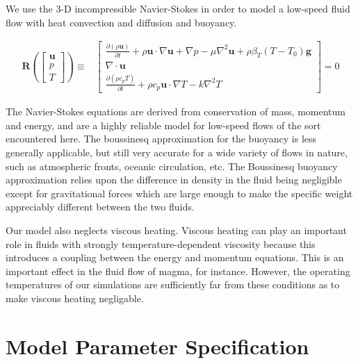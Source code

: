 \documentclass{article}
\newcommand{\bv}[1]{{\ensuremath{\boldsymbol{#1}}}}
\begin{document}
We use the 3-D incompressible Navier-Stokes in order to model a
low-speed fluid flow with heat convection and diffusion and buoyancy. 

\begin{align*}
    \bv{R}\left(\left[
    \begin{array}{l}
        \bv{u} \\
        p \\
        T 
    \end{array}
    \right]\right) \equiv& 
    \left[
    \begin{array}{l}
        \frac{\partial (\rho \bv{u})}{\partial t} + \rho \bv{u} \cdot
    \nabla \bv{u} + \nabla p - \mu \nabla^2 \bv{u} + 
    \rho \beta_T (T - T_0) \bv{g} \\
    \nabla \cdot \bv{u} \\
    \frac{\partial (\rho c_p T)}{\partial t} + \rho c_p \bv{u} \cdot
    \nabla T - k \nabla^2 T
    \end{array} 
    \right] = 0
\end{align*}

The Navier-Stokes equations are derived from conservation of mass,
momentum and energy, and are a highly reliable model for low-speed flows
of the sort encountered here. The boussinesq approximation for the
buoyancy is less generally applicable, but still very accurate for a
wide variety of flows in nature, such as atmospheric fronts, oceanic
circulation, etc. The Boussinesq buoyancy approximation relies upon the
difference in density in the fluid being negligible except for gravitational
forces which are large enough to make the specific weight appreciably different
between the two fluids.

Our model also neglects viscous heating. Viscous heating can play an
important role in fluids with strongly temperature-dependent viscosity
because this introduces a coupling between the energy and momentum
equations. This is an important effect in the fluid flow of magma, for
instance.  However, the operating temperatures of our simulations are
sufficiently far from these conditions as to make viscous heating
negligable. 



%
% 
%
%
\section{Model Parameter Specification}
\end{document}
